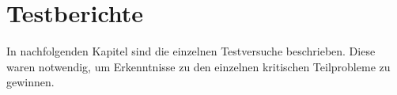 \section{Testberichte}
In nachfolgenden Kapitel sind die einzelnen Testversuche beschrieben. Diese waren notwendig, um Erkenntnisse zu den einzelnen kritischen Teilprobleme zu gewinnen.